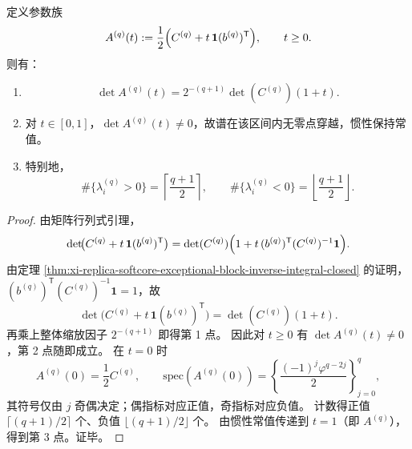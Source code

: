\begin{theorem}[秩一耦合参数下的惯性刚性]\label{thm:xi-replica-softcore-exceptional-rankone-coupling-inertia-rigidity}
定义参数族
\[
A^{(q)}(t):=\frac12\Bigl(C^{(q)}+t\,\mathbf 1(b^{(q)})^{\mathsf T}\Bigr),\qquad t\ge 0.
\]
则有：
\begin{enumerate}
  \item
  \[
  \det A^{(q)}(t)=2^{-(q+1)}\det(C^{(q)})(1+t).
  \]
  \item 对 \(t\in[0,1]\)，\(\det A^{(q)}(t)\neq0\)，故谱在该区间内无零点穿越，惯性保持常值。
  \item 特别地，
  \[
  \#\{\lambda_i^{(q)}>0\}=\left\lceil\frac{q+1}{2}\right\rceil,\qquad
  \#\{\lambda_i^{(q)}<0\}=\left\lfloor\frac{q+1}{2}\right\rfloor.
  \]
\end{enumerate}
\end{theorem}
\begin{proof}
由矩阵行列式引理，
\[
\det\!\bigl(C^{(q)}+t\,\mathbf 1(b^{(q)})^{\mathsf T}\bigr)
=\det(C^{(q)})\Bigl(1+t\,(b^{(q)})^{\mathsf T}(C^{(q)})^{-1}\mathbf 1\Bigr).
\]
由定理 \ref{thm:xi-replica-softcore-exceptional-block-inverse-integral-closed} 的证明，
\(
(b^{(q)})^{\mathsf T}(C^{(q)})^{-1}\mathbf 1=1
\)，故
\[
\det\!\bigl(C^{(q)}+t\,\mathbf 1(b^{(q)})^{\mathsf T}\bigr)=\det(C^{(q)})(1+t).
\]
再乘上整体缩放因子 \(2^{-(q+1)}\) 即得第 1 点。
因此对 \(t\ge0\) 有 \(\det A^{(q)}(t)\neq0\)，第 2 点随即成立。
在 \(t=0\) 时
\[
A^{(q)}(0)=\frac12C^{(q)},\qquad
\mathrm{spec}(A^{(q)}(0))=\left\{\frac{(-1)^j\varphi^{q-2j}}{2}\right\}_{j=0}^{q},
\]
其符号仅由 \(j\) 奇偶决定；偶指标对应正值，奇指标对应负值。
计数得正值 \(\lceil(q+1)/2\rceil\) 个、负值 \(\lfloor(q+1)/2\rfloor\) 个。
由惯性常值传递到 \(t=1\)（即 \(A^{(q)}\)），得到第 3 点。证毕。
\end{proof}


